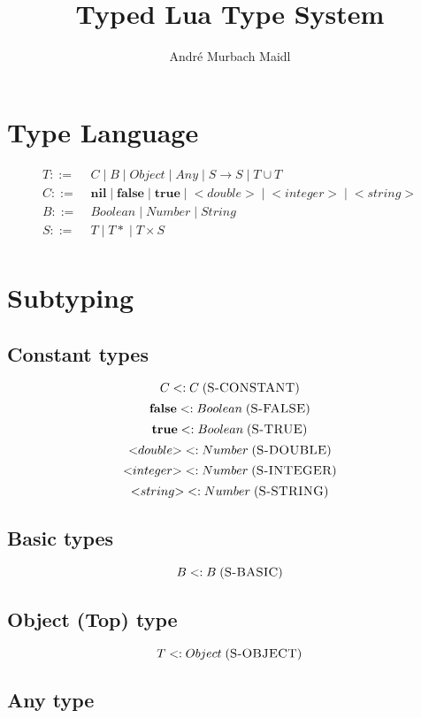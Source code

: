\documentclass[12pt]{article}
\title{Typed Lua Type System}
\author{André Murbach Maidl}
\newcommand{\mylabel}[1]{\; (\textsc{#1})}
\newcommand{\subtype}{<:}
\newcommand{\pipe}{\;|\;}
\begin{document}
\maketitle

\section{Type Language}

\begin{align*}
T ::= \; & C \pipe B \pipe Object \pipe Any \pipe
S \rightarrow S \pipe T \cup T\\
C ::= \; & \mathbf{nil} \pipe \mathbf{false} \pipe \mathbf{true}
\pipe {<}double{>} \pipe {<}integer{>} \pipe {<}string{>}\\
B ::= \; & Boolean \pipe Number \pipe String\\
S ::= \; & T \pipe {T*} \pipe T \times S\\ 
\end{align*}

\section{Subtyping}

\subsection{Constant types}

\[
C \subtype C
\mylabel{S-CONSTANT}
\]
\[
\mathbf{false} \subtype Boolean
\mylabel{S-FALSE}
\]
\[
\mathbf{true} \subtype Boolean
\mylabel{S-TRUE}
\]
\[
{<}double{>} \subtype Number
\mylabel{S-DOUBLE}
\]
\[
{<}integer{>} \subtype Number
\mylabel{S-INTEGER}
\]
\[
{<}string{>} \subtype Number
\mylabel{S-STRING}
\]

\subsection{Basic types}

\[
B \subtype B
\mylabel{S-BASIC}
\]

\subsection{Object (Top) type}

\[
T \subtype Object
\mylabel{S-OBJECT}
\]

\subsection{Any type}
\end{document}
